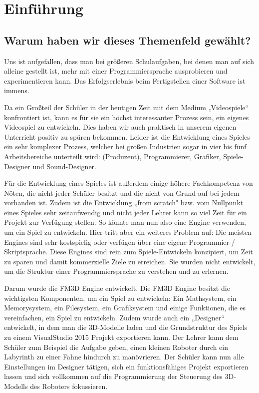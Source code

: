 
\chapter{Einführung}
\label{c:einführung}
\setcounter{page}{1}
\section[Warum dieses Themenfeld?]{Warum haben wir dieses Themenfeld gewählt?}

Uns ist aufgefallen, dass man bei größeren Schulaufgaben, bei denen man auf sich alleine gestellt ist, mehr mit einer Programmiersprache ausprobieren und experimentieren kann. Das Erfolgserlebnis beim Fertigstellen einer Software ist immens. 

Da ein Großteil der Schüler in der heutigen Zeit mit dem Medium „Videospiele“ konfrontiert ist, kann es für sie ein höchst interessanter Prozess sein, ein eigenes Videospiel zu entwickeln. Dies haben wir auch praktisch in unserem eigenen Unterricht positiv zu spüren bekommen.
Leider ist die Entwicklung eines Spieles ein sehr komplexer Prozess, welcher bei großen Industrien sogar in vier bis fünf Arbeitsbereiche unterteilt wird: (Produzent), Programmierer, Grafiker, Spiele-Designer und Sound-Designer.  \cite{gea}

Für die Entwicklung eines Spieles ist außerdem einige höhere Fachkompetenz von Nöten, die nicht jeder Schüler besitzt und die nicht von Grund auf bei jedem vorhanden ist. Zudem ist die Entwicklung „from scratch"  bzw. vom Nullpunkt eines Spieles sehr zeitaufwendig und nicht jeder Lehrer kann so viel Zeit für ein Projekt zur Verfügung stellen. 
So könnte man nun also eine Engine verwenden, um ein Spiel zu entwickeln. Hier tritt aber ein weiteres Problem auf: Die meisten Engines sind sehr kostspielig oder verfügen über eine eigene Programmier-/ Skriptsprache. Diese Engines sind rein zum Spiele-Entwickeln konzipiert, um Zeit zu sparen und damit kommerzielle Ziele zu erreichen. Sie wurden nicht entwickelt, um die Struktur einer Programmiersprache zu verstehen und zu erlernen.

Darum wurde die \ac{FM3D} Engine entwickelt. Die FM3D Engine besitzt die wichtigsten Komponenten, um ein Spiel zu entwickeln: Ein Mathsystem, ein Memorysystem, ein Filesystem, ein Grafiksystem und einige Funktionen, die es vereinfachen, ein Spiel zu entwickeln.
Zudem wurde auch ein „Designer“ entwickelt, in dem man die 3D-Modelle laden und die Grundstruktur des Spiels zu einem VisualStudio 2015 Projekt exportieren kann.
Der Lehrer kann dem Schüler zum Beispiel die Aufgabe geben, einen kleinen Roboter durch ein Labyrinth zu einer Fahne hindurch zu manövrieren. Der Schüler kann nun alle Einstellungen im Designer tätigen, sich ein funktionsfähiges Projekt exportieren lassen und sich vollkommen auf die Programmierung der Steuerung des 3D-Modells des Roboters fokussieren.

